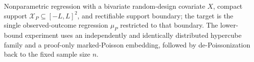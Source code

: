Nonparametric regression with a bivariate random-design covariate \(X\), compact support \(\mathcal X_P\subseteq[-L,L]^2\), and rectifiable support boundary; the target is the single observed-outcome regression \(\mu_P\) restricted to that boundary.  The lower-bound experiment uses an independently and identically distributed hypercube family and a proof-only marked-Poisson embedding, followed by de-Poissonization back to the fixed sample size \(n\).